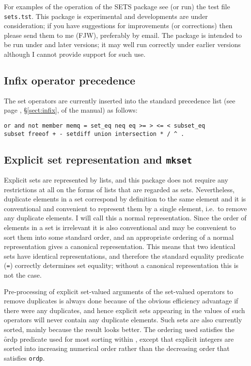 For examples of the operation of the SETS package see (or run) the
test file \texttt{sets.tst}.  This package is experimental and
developments are under consideration; if you have suggestions for
improvements (or corrections) then please send them to me (FJW),
preferably by email.  The package is intended to be run under
 and later versions; it may well run correctly under earlier
versions although I cannot provide support for such use.


\subsection{Infix operator precedence}

The set operators are currently inserted into the standard \REDUCE
precedence list (see page \pageref{sect:infix}, \S\ref{sect:infix}, of the \REDUCE manual) as
follows:
\begin{verbatim}
or and not member memq = set_eq neq eq >= > <= < subset_eq
subset freeof + - setdiff union intersection * / ^ .
\end{verbatim}


\subsection{Explicit set representation and \texttt{mkset}}
\hypertarget{operator:MKSET}{}

Explicit sets are represented by lists, and this package does not
require any restrictions at all on the forms of lists that are
regarded as sets.  Nevertheless, duplicate elements in a set
correspond by definition to the same element and it is conventional
and convenient to represent them by a single element, i.e.\ to remove
any duplicate elements.  I will call this a normal representation.
Since the order of elements in a set is irrelevant it is also
conventional and may be convenient to sort them into some standard
order, and an appropriate ordering of a normal representation gives a
canonical representation.  This means that two identical sets have
identical representations, and therefore the standard \REDUCE equality
predicate (\texttt{=}) 
correctly determines set equality; without a
canonical representation this is not the case.

Pre-processing of explicit set-valued arguments of the set-valued
operators to remove duplicates is always done because of the obvious
efficiency advantage if there were any duplicates, and hence explicit
sets appearing in the values of such operators will never contain any
duplicate elements.  Such sets are also currently sorted, mainly
because the result looks better.  The ordering used satisfies the \f{ordp}
predicate used for most sorting within \REDUCE, except that
explicit integers are sorted into increasing numerical order rather
than the decreasing order that satisfies \texttt{ordp}.


